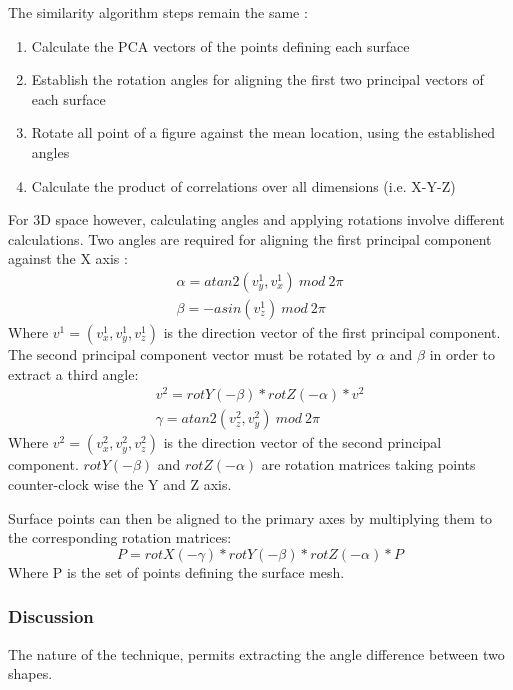 \documentclass[
    floatsintext
]{article}
\begin{document}
The similarity algorithm steps remain the same : 
\begin{enumerate}
    \item Calculate the PCA vectors of the points defining each surface 
    \item Establish the rotation angles for aligning the first two principal vectors of each surface 
    \item Rotate all point of a figure against the mean location, using the established angles
    \item Calculate the product of correlations over all dimensions (i.e. X-Y-Z) 
\end{enumerate}

For 3D space however, calculating angles and applying rotations involve different calculations.
Two angles are required for aligning the first principal component against the X axis : 
\begin{equation*}
  \begin{split}
    \alpha = atan2(v_y^1,v_x^1)\ mod\ 2\pi\\
    \beta = -asin(v_z^1)\ mod\ 2\pi
  \end{split}
\end{equation*}
Where $v^1=(v_x^1,v_y^1,v_z^1)$ is the direction vector of the first principal component.
The second principal component vector must be rotated by $\alpha$ and $\beta$ in order to extract a third angle: 
\begin{equation*}
  \begin{split}
    v^2 = rotY(-\beta) * rotZ(-\alpha) * v^2\\
    \gamma = atan2(v_z^2,v_y^2)\ mod\ 2\pi 
  \end{split}
\end{equation*}
Where $v^2=(v_x^2,v_y^2,v_z^2)$ is the direction vector of the second principal component. 
$rotY(-\beta)$ and $rotZ(-\alpha)$ are rotation matrices taking points counter-clock wise the Y and Z axis.   

Surface points can then be aligned to the primary axes by multiplying them to the corresponding rotation matrices:  
\begin{equation*}
   P = rotX(-\gamma) * rotY(-\beta) * rotZ(-\alpha) * P
\end{equation*}
Where P is the set of points defining the surface mesh.

\subsubsection{Discussion}
The nature of the technique, permits extracting the angle difference between two shapes.  
\end{document}

